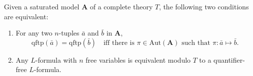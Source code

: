 Given a saturated model $\mathbf{A}$ of a complete theory $T$, the following two conditions are equivalent:

\begin{enumerate}
  \item[(i)] For any two $n$-tuples $\bar{a}$ and $\bar{b}$ in $\mathbf{A}$,
  $$\text{qftp}(\bar{a}) = \text{qftp}(\bar{b}) \quad \text{iff there is } \pi \in \text{Aut}(\mathbf{A}) \text{ such that } \pi : \bar{a} \mapsto \bar{b}.$$
  \item[(ii)] Any $L$-formula with $n$ free variables is equivalent modulo $T$ to a quantifier-free $L$-formula.
\end{enumerate}

